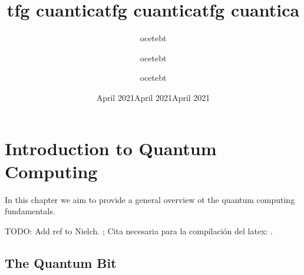 
\chapter{Introduction to Quantum Computing}

In this chapter we aim to provide a general overview ot the quantum computing fundamentals.

TODO: Add ref to Nielch. ; Cita necesaria para la compilación del latex: 
\cite{Smith1981}.

\section{The Quantum Bit}



\documentclass{article}
\usepackage[utf8]{inputenc}

\title{tfg cuantica}
\author{ocetebt }
\date{April 2021}

\documentclass{article}
\usepackage[utf8]{inputenc}

\usepackage{graphicx}

\title{tfg cuantica}
\author{ocetebt }
\date{April 2021}

\documentclass{article}
\usepackage[utf8]{inputenc}

\usepackage{graphicx}
\usepackage{amsmath}

\title{tfg cuantica}
\author{ocetebt }
\date{April 2021}


	
	
	
